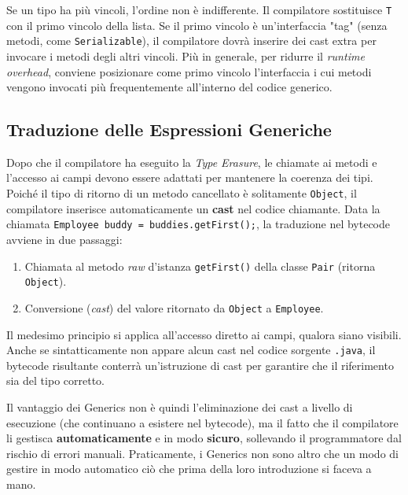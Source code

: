 \begin{warningbox}
Se un tipo ha più vincoli, l'ordine non è indifferente. Il compilatore sostituisce \texttt{T} con il primo vincolo della lista. Se il primo vincolo è un'interfaccia "tag" (senza metodi, come \texttt{Serializable}), il compilatore dovrà inserire dei cast extra per invocare i metodi degli altri vincoli. 
Più in generale, per ridurre il \textit{runtime overhead}, conviene posizionare come primo vincolo l'interfaccia i cui metodi vengono invocati più frequentemente all'interno del codice generico.
\end{warningbox}

\subsection{Traduzione delle Espressioni Generiche}

Dopo che il compilatore ha eseguito la \textit{Type Erasure}, le chiamate ai metodi e l'accesso ai campi devono essere adattati per mantenere la coerenza dei tipi.
Poiché il tipo di ritorno di un metodo cancellato è solitamente \texttt{Object}, il compilatore inserisce automaticamente un \textbf{cast} nel codice chiamante. 
Data la chiamata \texttt{Employee buddy = buddies.getFirst();}, la traduzione nel bytecode avviene in due passaggi:

\begin{enumerate}
    \item Chiamata al metodo \textit{raw} d'istanza \texttt{getFirst()} della classe \texttt{Pair} (ritorna \texttt{Object}).
    \item Conversione (\textit{cast}) del valore ritornato da \texttt{Object} a \texttt{Employee}.
\end{enumerate}

\medskip

Il medesimo principio si applica all'accesso diretto ai campi, qualora siano visibili. Anche se sintatticamente non appare alcun cast nel codice sorgente \texttt{.java}, il bytecode risultante conterrà un'istruzione di cast per garantire che il riferimento sia del tipo corretto.

Il vantaggio dei Generics non è quindi l'eliminazione dei cast a livello di esecuzione (che continuano a esistere nel bytecode), ma il fatto che il compilatore li gestisca \textbf{automaticamente} e in modo \textbf{sicuro}, sollevando il programmatore dal rischio di errori manuali. Praticamente, i Generics non sono altro che un modo di gestire in modo automatico ciò che prima della loro introduzione si faceva a mano.

